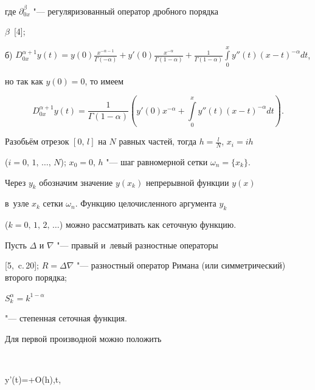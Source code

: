 где $\partial^\beta_{0x}$ "--- регуляризованный оператор дробного порядка 

$\beta$~[4]; 



б) $\displaystyle  D^{\alpha+1}_{0x}y(t)=y(0)\frac{x^{-\alpha-1}}{\Gamma(-\alpha)}+ 

y'(0)\frac{x^{-\alpha}}{\Gamma(1-\alpha)}+ 

\frac{1}{\Gamma(1-\alpha)}\int\limits_0^x 

y''(t)(x-t)^{-\alpha}dt$,  



\noindent 

но так как $y(0)=0$, то имеем 

\begin{equation} 

\label{ch4} 

D^{\alpha+1}_{0x}y(t)=\frac{1}{\Gamma(1-\alpha)}\left( 

y'(0)x^{-\alpha}+\int\limits_0^x 

y''(t)(x-t)^{-\alpha}dt\right). 

\end{equation} 



Разобьём отрезок $[0,\,l]$ на $N$ равных частей, тогда $h=\frac lN$, $x_i=i h$

($i=0,\,1,\,\dots,\,N$); $x_0=0$, $h$ "--- шаг равномерной сетки $\omega_n=\{x_k\}$. 



Через $y_k$ обозначим значение $y(x_k)$ непрерывной функции $y(x)$  

в~узле $x_k$  сетки $\omega_n$. Функцию целочисленного аргумента $y_k$ 

($k=0,\,1,\,2,\,\dots$)  можно рассматривать как сеточную функцию. 



Пусть $\Delta$ и $\nabla$ "--- правый и~левый разностные операторы

[5,~c.\,20]; $R=\Delta\nabla$ "---  разностный оператор Римана (или симметрический) второго порядка;

$ 

S_k^\alpha=k^{1-\alpha} 

$  

"--- степенная сеточная функция. 



Для первой производной можно положить 

$$ 

y'(t)=+O(h),\quad \forall t\in[x_{k-1},\,x_{k}], 

